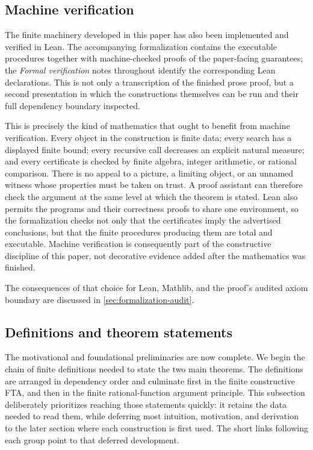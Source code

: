 \documentclass[11pt]{article}
\begin{document}
\subsection{Machine verification}

The finite machinery developed in this paper has also been implemented and
verified in Lean.  The accompanying formalization contains the executable
procedures together with machine-checked proofs of the paper-facing
guarantees; the \emph{Formal verification} notes throughout identify the
corresponding Lean declarations.  This is not only a transcription of the
finished prose proof, but a second presentation in which the constructions
themselves can be run and their full dependency boundary inspected.

This is precisely the kind of mathematics that ought to benefit from machine
verification.  Every object in the construction is finite data; every search
has a displayed finite bound; every recursive call decreases an explicit
natural measure; and every certificate is checked by finite algebra, integer
arithmetic, or rational comparison.  There is no appeal to a picture, a
limiting object, or an unnamed witness whose properties must be taken on
trust.  A proof assistant can therefore check the argument at the same level
at which the theorem is stated.  Lean also permits the programs and their
correctness proofs to share one environment, so the formalization checks not
only that the certificates imply the advertised conclusions, but that the
finite procedures producing them are total and executable.  Machine
verification is consequently part of the constructive discipline of this
paper, not decorative evidence added after the mathematics was finished.

The consequences of that choice for Lean, Mathlib, and the proof's audited
axiom boundary are discussed in \cref{sec:formalization-audit}.

\subsection{Definitions and theorem statements}

The motivational and foundational preliminaries are now complete.  We begin
the chain of finite definitions needed to state the two main theorems.  The
definitions are arranged in dependency order and culminate first in the
finite constructive FTA, and then in the finite rational-function argument
principle.  This subsection deliberately prioritizes reaching those
statements quickly: it retains the data needed to read them, while deferring
most intuition, motivation, and derivation to the later section where each
construction is first used.  The short links following each group point to
that deferred development.
\end{document}

